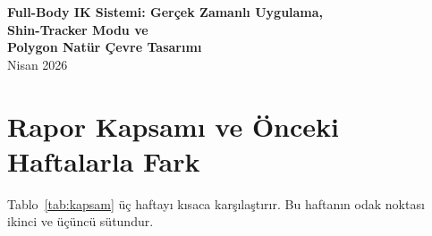 \documentclass[11pt,a4paper]{article}
\begin{document}
\begin{center}
    {\LARGE\bfseries Full-Body IK Sistemi: Ger\c{c}ek Zamanl{\i} Uygulama,\\[4pt]
    Shin-Tracker Modu ve\\[4pt]
    \textcolor{polygreen}{Polygon Nat\"ur} \c{C}evre Tasar{\i}m{\i}}\\[12pt]
    {\normalsize Nisan 2026}
\end{center}

\vspace{6pt}

\begin{abstract}
Bu rapor \"onceki iki haftayo \"ozetlemez; bunun yerine hafta~1--2'de
\textbf{analiz edilen ancak uygulanmayan} bile\c{s}enlerin yaz{\i}l{\i}m
uygulamas{\i}n{\i} ve hafta~1--2'de hi\c{c} ele al{\i}nmam{\i}\c{s}
yeni geli\c{s}meleri sunar. Yeni ba\c{s}l{\i}klar:
(1)~FullBodyTracking sistemi alt{\i} ye\c{s}il sahas{\i} olarak
uyguland{\i}: \textit{shin-tracker modu} (kaval kemi\u{g}ine monte
tracker'dan diz/ayak bile\u{g}i t\"uretimi), \textit{5-tracker
do\u{g}rudan FK modu}, \textit{omurga CCD \c{c}\"oz\"uc\"us\"u}
(bend + twist da\u{g}{\i}t{\i}m{\i}), \textit{bind-pose s{\i}f{\i}rlama}
(her kare), \textit{editor araç bile\c{s}enleri}
(\texttt{MixamoBoneAutoFinder}, \texttt{FullBodyIKEditorTestDriver}),
\textit{iki modlu tracker atamas{\i}} (Explicit~Index ve Uzaysal
Analiz) ve g\"o\u{g}\"us/bel \textit{torso tracker
d\"on\"u\c{s}\"um\"u}.
(2)~Sahnede olu\c{s}turulan d{\i}\c{s} mekan rehabilitasyon \c{c}evresi,
Synty \textsc{Polygon Nat\"ur} (Unity Asset Store) paketi
kullan{\i}larak tasarlanm{\i}\c{s}; low-poly a\u{g}a\c{c},
kaya, bitki ve atmosferik efekt varl{\i}klar{\i} sahneye
entegre edilmi\c{s}tir.
\end{abstract}

\tableofcontents
\vspace{8pt}

\section{Rapor Kapsam{\i} ve \"Onceki Haftalarla Fark}
\label{sec:kapsam}

Tablo~\ref{tab:kapsam} \"u\c{c} haftay{\i} k{\i}saca kar\c{s}{\i}la\c{s}t{\i}r{\i}r.
Bu haftan{\i}n odak noktas{\i} ikinci ve \"u\c{c}\"unc\"u s\"utundur.
\end{document}
